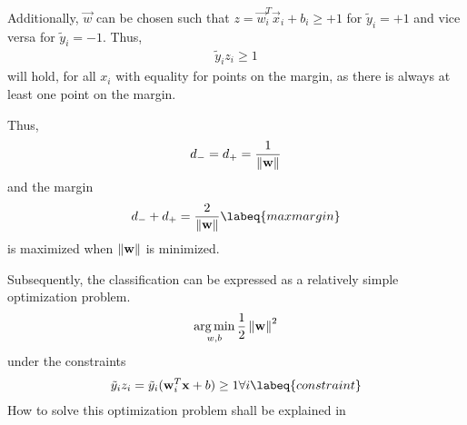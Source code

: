 Additionally, $\vec{w}$ can be chosen such that $z = \vec{w}_i^T \vec{x}_i + b_i \geq +1$ for $\tilde{y}_i = +1$ and vice versa for $\tilde{y}_i = -1$.
Thus,
\begin{align}
    \tilde{y}_i z_i \geq 1
\end{align}
will hold, for all $x_i$ with equality for points on the margin, as there is always at least one point on the margin.

Thus,
\begin{align}
    d_- = d_+ = \frac{1}{\left\lVert\mathbf{w}\right\rVert}
\end{align}
and the margin
\begin{align}
    d_- + d_+ = \frac{2}{\norm{\vec{w}}}
    \labeq{maxmargin}
\end{align}
is maximized when $\left\lVert\mathbf{w}\right\rVert$ is minimized.

Subsequently, the classification can be expressed as a relatively simple optimization problem.
\begin{align}
    \operatorname*{arg\,min}_{w, b} \frac{1}{2} \left\lVert\mathbf{w}\right\rVert^2
\end{align}
under the constraints
\begin{align}
    \tilde{y}_i z_i = \tilde{y}_i (\vec{w}_i^T \vec{x} + b) \geq 1 \forall i
    \labeq{constraint}
\end{align}
How to solve this optimization problem shall be explained in 












